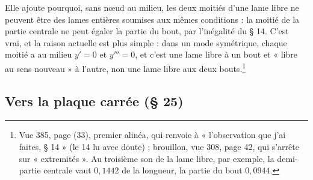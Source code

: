 \documentclass[11pt,a4paper]{article}
\begin{document}
Elle ajoute pourquoi, sans nœud au milieu, les deux moitiés d'une lame libre ne peuvent être des lames entières soumises aux mêmes conditions : la moitié de la partie centrale ne peut égaler la partie du bout, par l'inégalité du § 14. C'est vrai, et la raison actuelle est plus simple : dans un mode symétrique, chaque moitié a au milieu $y'=0$ et $y'''=0$, et c'est une lame libre à un bout et « libre au sens nouveau » à l'autre, non une lame libre aux deux bouts.\footnote{Vue 385, page (33), premier alinéa, qui renvoie à « l'observation que j'ai faites, § 14 » (le 14 lu avec doute) ; brouillon, vue 308, page 42, qui s'arrête sur « extremités ». Au troisième son de la lame libre, par exemple, la demi-partie centrale vaut $0{,}1442$ de la longueur, la partie du bout $0{,}0944$.}

\subsection*{Vers la plaque carrée (§ 25)}
\end{document}
